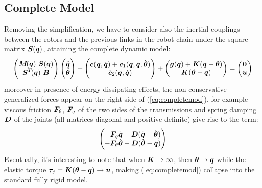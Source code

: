 \subsection{Complete Model}
Removing the simplification, we have to consider also the inertial couplings between the rotors and the previous links in the robot chain under the square matrix $\boldsymbol{S}({\boldsymbol{q}})$, attaining the complete dynamic model:
\begin{equation}\label{eq:completemod}
    \begin{pmatrix}\boldsymbol{M}\!({\boldsymbol{q}})~\boldsymbol{S}({\boldsymbol{q}})\\ \boldsymbol{S}^T\!({\boldsymbol{q}})~\boldsymbol{B}\end{pmatrix}
    \begin{pmatrix}\ddot{\boldsymbol{q}}\\ \ddot{\boldsymbol{\theta}}\end{pmatrix} +
    \begin{pmatrix}\boldsymbol{c}({\boldsymbol{q}},\dot{\boldsymbol{q}})+\boldsymbol{c}_1({\boldsymbol{q}},\dot{\boldsymbol{q}},\dot{\boldsymbol{\theta}})\\ \dot{\boldsymbol{c}}_2({\boldsymbol{q}},\dot{\boldsymbol{q}})\end{pmatrix} +
    \begin{pmatrix}\boldsymbol{g}({\boldsymbol{q}})+\boldsymbol{K}({\boldsymbol{q}}-\boldsymbol{\theta})\\ \boldsymbol{K}(\boldsymbol{\theta}-{\boldsymbol{q}})\end{pmatrix} =
    \begin{pmatrix} \boldsymbol{0} \\ \boldsymbol{u} \end{pmatrix}
\end{equation}
moreover in presence of energy-dissipating effects, the non-conservative generalized forces appear on the right side of (\ref{eq:completemod}), for example viscous friction $\boldsymbol{F}_{\!\theta}$, $\boldsymbol{F}_{\!q}$ of the two sides of the transmissions and spring damping $\boldsymbol{D}$ of the joints (all matrices diagonal and positive definite) give rise to the term:
\begin{equation}
    \begin{pmatrix} -\boldsymbol{F}_{\!q}\dot{\boldsymbol{q}}-\boldsymbol{D}(\dot{\boldsymbol{q}}-\dot{\boldsymbol{\theta}}) \\
    -\boldsymbol{F}_{\!\theta}\dot{\boldsymbol{\theta}}-\boldsymbol{D}(\dot{\boldsymbol{\theta}}-\dot{\boldsymbol{q}})
    \end{pmatrix}
\end{equation}
Eventually, it's interesting to note that when $\boldsymbol{K} \rightarrow \infty $, then $\boldsymbol{\theta} \rightarrow {\boldsymbol{q}} $ while the elastic torque $\boldsymbol{\tau}_{\!j}=\boldsymbol{K}(\boldsymbol{\theta}-{\boldsymbol{q}}) \rightarrow \boldsymbol{u}$, making (\ref{eq:completemod}) collapse into the standard fully rigid model.